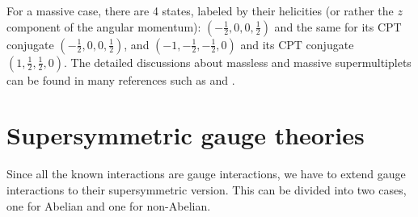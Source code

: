 \documentclass[12pt]{report}
\begin{document}
For a massive case, there are 4 states, labeled by their helicities (or rather the $z$ component of the angular momentum): $(-\frac{1}{2}, 0, 0, \frac{1}{2})$ and the same for its CPT conjugate $(-\frac{1}{2}, 0, 0, \frac{1}{2})$, and $(-1, -\frac{1}{2}, -\frac{1}{2}, 0)$ and its CPT conjugate $(1, \frac{1}{2}, \frac{1}{2}, 0)$.
The detailed discussions about massless and massive supermultiplets can be found in many references such as \cite{Bilal} and \cite{larsenf}.





\chapter{Supersymmetric gauge theories}

Since all the known interactions are gauge interactions, we have to extend gauge interactions to their supersymmetric version.
This can be divided into two cases, one for Abelian and one for non-Abelian.
\end{document}
